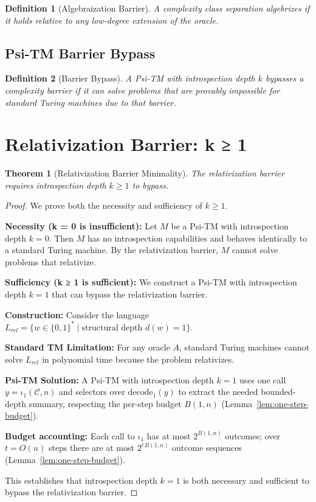 \documentclass[11pt]{article}
\newtheorem{definition}{Definition}
\newtheorem{theorem}{Theorem}
\begin{document}
\begin{definition}[Algebraization Barrier]
A complexity class separation algebrizes if it holds relative to any low-degree extension of the oracle.
\end{definition}

\subsection{Psi-TM Barrier Bypass}

\begin{definition}[Barrier Bypass]
A Psi-TM with introspection depth $k$ bypasses a complexity barrier if it can solve problems that are provably impossible for standard Turing machines due to that barrier.
\end{definition}

\section{Relativization Barrier: k ≥ 1}

\begin{theorem}[Relativization Barrier Minimality]
The relativization barrier requires introspection depth $k \geq 1$ to bypass.
\end{theorem}

\begin{proof}
We prove both the necessity and sufficiency of $k \geq 1$.

\textbf{Necessity (k = 0 is insufficient):}
Let $M$ be a Psi-TM with introspection depth $k = 0$. Then $M$ has no introspection capabilities and behaves identically to a standard Turing machine. By the relativization barrier, $M$ cannot solve problems that relativize.

\textbf{Sufficiency (k ≥ 1 is sufficient):}
We construct a Psi-TM with introspection depth $k = 1$ that can bypass the relativization barrier.

\textbf{Construction:}
Consider the language $L_{rel} = \{w \in \{0,1\}^* \mid \text{structural depth } d(w) = 1\}$.

\textbf{Standard TM Limitation:}
For any oracle $A$, standard Turing machines cannot solve $L_{rel}$ in polynomial time because the problem relativizes.

\textbf{Psi-TM Solution:}
A Psi-TM with introspection depth $k = 1$ uses one call $y=\iota_1(\mathcal{C},n)$ and selectors over $\mathrm{decode}_1(y)$ to extract the needed bounded-depth summary, respecting the per-step budget $B(1,n)$ (Lemma~\ref{lem:one-step-budget}).

\textbf{Budget accounting:}
Each call to $\iota_1$ has at most $2^{B(1,n)}$ outcomes; over $t=O(n)$ steps there are at most $2^{t\,B(1,n)}$ outcome sequences (Lemma~\ref{lem:one-step-budget}).

This establishes that introspection depth $k = 1$ is both necessary and sufficient to bypass the relativization barrier.
\end{proof}
\end{document}
